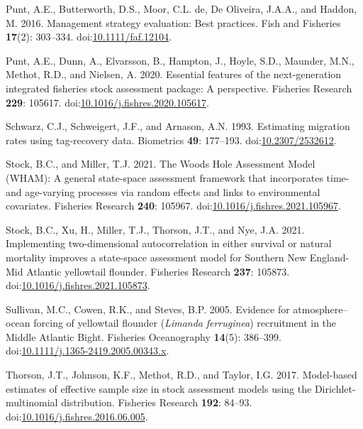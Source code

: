 \documentclass[
]{article}
\newlength{\cslhangindent}
\newlength{\cslentryspacingunit} %
\newenvironment{CSLReferences}[2] %
 {%
  \setlength{\parindent}{0pt}
  \ifodd #1
  \let\oldpar\par
  \def\par{\hangindent=\cslhangindent\oldpar}
  \fi
  \setlength{\parskip}{#2\cslentryspacingunit}
 }%
 {}
\begin{document}
\begin{CSLReferences}{1}{0}
\leavevmode{}%
Punt, A.E., Butterworth, D.S., Moor, C.L. de, De Oliveira, J.A.A., and Haddon, M. 2016. Management strategy evaluation: Best practices. Fish and Fisheries \textbf{17}(2): 303--334. doi:\href{https://doi.org/10.1111/faf.12104}{10.1111/faf.12104}.

\leavevmode{}%
Punt, A.E., Dunn, A., Elvarsson, B., Hampton, J., Hoyle, S.D., Maunder, M.N., Methot, R.D., and Nielsen, A. 2020. Essential features of the next-generation integrated fisheries stock assessment package: A perspective. Fisheries Research \textbf{229}: 105617. doi:\href{https://doi.org/10.1016/j.fishres.2020.105617}{10.1016/j.fishres.2020.105617}.

\leavevmode{}%
Schwarz, C.J., Schweigert, J.F., and Arnason, A.N. 1993. Estimating migration rates using tag-recovery data. Biometrics \textbf{49}: 177--193. doi:\href{https://doi.org/10.2307/2532612}{10.2307/2532612}.

\leavevmode{}%
Stock, B.C., and Miller, T.J. 2021. The {Woods Hole Assessment Model} ({WHAM}): A general state-space assessment framework that incorporates time- and age-varying processes via random effects and links to environmental covariates. Fisheries Research \textbf{240}: 105967. doi:\href{https://doi.org/10.1016/j.fishres.2021.105967}{10.1016/j.fishres.2021.105967}.

\leavevmode{}%
Stock, B.C., Xu, H., Miller, T.J., Thorson, J.T., and Nye, J.A. 2021. Implementing two-dimensional autocorrelation in either survival or natural mortality improves a state-space assessment model for {Southern New England}-{Mid Atlantic} yellowtail flounder. Fisheries Research \textbf{237}: 105873. doi:\href{https://doi.org/10.1016/j.fishres.2021.105873}{10.1016/j.fishres.2021.105873}.

\leavevmode{}%
Sullivan, M.C., Cowen, R.K., and Steves, B.P. 2005. Evidence for atmosphere{--}ocean forcing of yellowtail flounder (\emph{{L}imanda} \emph{ferruginea}) recruitment in the {M}iddle {A}tlantic {B}ight. Fisheries Oceanography \textbf{14}(5): 386--399. doi:\href{https://doi.org/10.1111/j.1365-2419.2005.00343.x}{10.1111/j.1365-2419.2005.00343.x}.

\leavevmode{}%
Thorson, J.T., Johnson, K.F., Methot, R.D., and Taylor, I.G. 2017. Model-based estimates of effective sample size in stock assessment models using the {D}irichlet-multinomial distribution. Fisheries Research \textbf{192}: 84--93. doi:\href{https://doi.org/10.1016/j.fishres.2016.06.005}{10.1016/j.fishres.2016.06.005}.


\end{CSLReferences}
\end{document}
